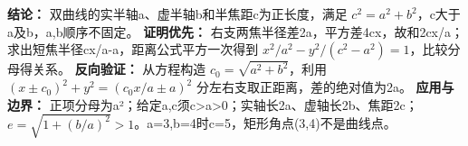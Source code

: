 \textbf{结论：} 双曲线的实半轴a、虚半轴b和半焦距c为正长度，满足 $c^2=a^2+b^2$，c大于a及b，a,b顺序不固定。
\textbf{证明优先：} 右支两焦半径差2a，平方差4cx，故和2cx/a；求出短焦半径cx/a-a，距离公式平方一次得到 $x^2/a^2-y^2/(c^2-a^2)=1$，比较分母得关系。
\textbf{反向验证：} 从方程构造 $c_0=\sqrt{a^2+b^2}$，利用 $(x\pm c_0)^2+y^2=(c_0x/a\pm a)^2$ 分左右支取正距离，差的绝对值为2a。
\textbf{应用与边界：} 正项分母为a²；给定a,c须c>a>0；实轴长2a、虚轴长2b、焦距2c；$e=\sqrt{1+(b/a)^2}>1$。a=3,b=4时c=5，矩形角点(3,4)不是曲线点。

